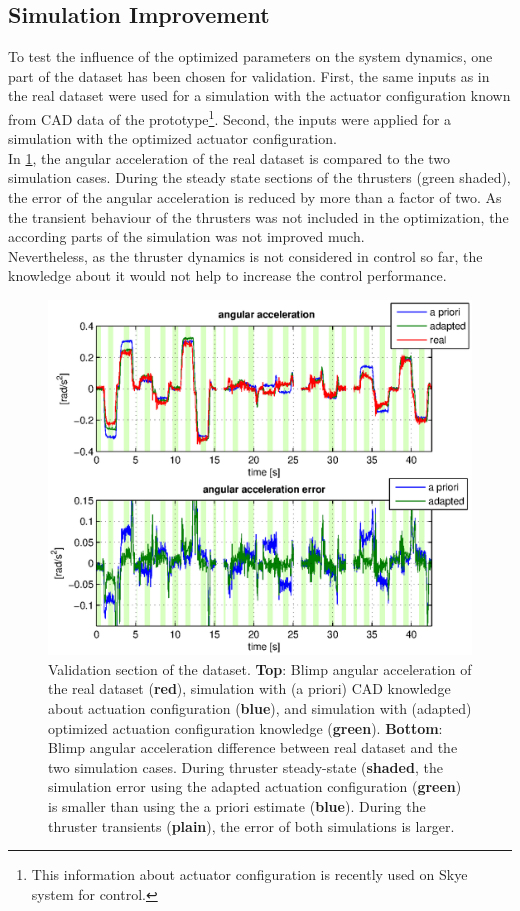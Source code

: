 \subsection{Simulation Improvement}
\label{sub:sim_improvement}
To test the influence of the optimized parameters on the system dynamics, one part of the dataset has been chosen for validation.
First, the same inputs as in the real dataset were used for a simulation with the actuator configuration known from CAD data of the prototype\footnote{
This information about actuator configuration is recently used on Skye system for control.}.
Second, the inputs were applied for a simulation with the optimized actuator configuration.\\
In \cref{fig:result_sim_improve_and_error}, the angular acceleration of the real dataset is compared to the two simulation cases.
During the steady state sections of the thrusters (green shaded), the error of the angular acceleration is reduced by more than a factor of two.
As the transient behaviour of the thrusters was not included in the optimization, the according parts of the simulation was not improved much.\\
Nevertheless, as the thruster dynamics is not considered in control so far, the knowledge about it would not help to increase the control performance.

\begin{figure}[hbtp]
\centering
\includegraphics[scale=0.8]{images/results/compare_alpha_x.eps}
\caption{Validation section of the dataset. \textbf{Top}: Blimp angular acceleration of the real dataset (\textbf{red}), simulation with (a priori) CAD knowledge about actuation configuration (\textbf{blue}), and simulation with (adapted) optimized actuation configuration knowledge (\textbf{green}).
\textbf{Bottom}: Blimp angular acceleration difference between real dataset and the two simulation cases.
During thruster steady-state (\textbf{shaded}, the simulation error using the adapted actuation configuration (\textbf{green}) is smaller than using the a priori estimate (\textbf{blue}).
During the thruster transients (\textbf{plain}), the error of both simulations is larger.
}
\label{fig:result_sim_improve_and_error}
\end{figure}

